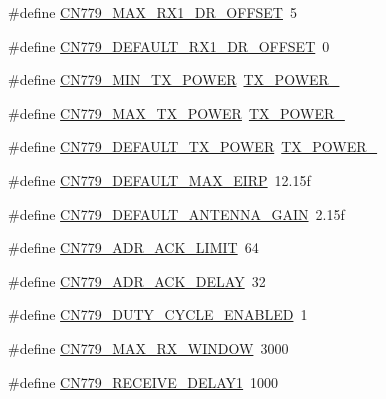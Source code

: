\begin{DoxyCompactItemize}
\item 
\#define \hyperlink{group__REGIONCN779_ga92a7cb914b3c213f1506f8dd927e6077}{C\+N779\+\_\+\+M\+A\+X\+\_\+\+R\+X1\+\_\+\+D\+R\+\_\+\+O\+F\+F\+S\+ET}~5
\item 
\#define \hyperlink{group__REGIONCN779_ga8e88b35f91ebd807975b5712ccbfef2a}{C\+N779\+\_\+\+D\+E\+F\+A\+U\+L\+T\+\_\+\+R\+X1\+\_\+\+D\+R\+\_\+\+O\+F\+F\+S\+ET}~0
\item 
\#define \hyperlink{group__REGIONCN779_gab0e266968cb85199e9002eb1d3c5a719}{C\+N779\+\_\+\+M\+I\+N\+\_\+\+T\+X\+\_\+\+P\+O\+W\+ER}~\hyperlink{group__REGION_ga0149d52581db80901b5bc1adf0aedd1d}{T\+X\+\_\+\+P\+O\+W\+E\+R\+\_}
\item 
\#define \hyperlink{group__REGIONCN779_ga8a70356561f3416db21a1e93b4ee4ae9}{C\+N779\+\_\+\+M\+A\+X\+\_\+\+T\+X\+\_\+\+P\+O\+W\+ER}~\hyperlink{group__REGION_gab33618449f2a573142c463ab071ef8ed}{T\+X\+\_\+\+P\+O\+W\+E\+R\+\_}
\item 
\#define \hyperlink{group__REGIONCN779_ga0a41ad46e00759176adb3ef4a8e937cb}{C\+N779\+\_\+\+D\+E\+F\+A\+U\+L\+T\+\_\+\+T\+X\+\_\+\+P\+O\+W\+ER}~\hyperlink{group__REGION_gab33618449f2a573142c463ab071ef8ed}{T\+X\+\_\+\+P\+O\+W\+E\+R\+\_}
\item 
\#define \hyperlink{group__REGIONCN779_ga77bd9b50f37cb6182e330e7203aab158}{C\+N779\+\_\+\+D\+E\+F\+A\+U\+L\+T\+\_\+\+M\+A\+X\+\_\+\+E\+I\+RP}~12.\+15f
\item 
\#define \hyperlink{group__REGIONCN779_ga055a39b4bc3aae2e812aab0a96561fee}{C\+N779\+\_\+\+D\+E\+F\+A\+U\+L\+T\+\_\+\+A\+N\+T\+E\+N\+N\+A\+\_\+\+G\+A\+IN}~2.\+15f
\item 
\#define \hyperlink{group__REGIONCN779_ga8c19c4c4ef1a00d6865607b7d61f0325}{C\+N779\+\_\+\+A\+D\+R\+\_\+\+A\+C\+K\+\_\+\+L\+I\+M\+IT}~64
\item 
\#define \hyperlink{group__REGIONCN779_ga56814f06a0fa6b826baad368920004a4}{C\+N779\+\_\+\+A\+D\+R\+\_\+\+A\+C\+K\+\_\+\+D\+E\+L\+AY}~32
\item 
\#define \hyperlink{group__REGIONCN779_ga87494ed194c1c38e301dbb4990f7f005}{C\+N779\+\_\+\+D\+U\+T\+Y\+\_\+\+C\+Y\+C\+L\+E\+\_\+\+E\+N\+A\+B\+L\+ED}~1
\item 
\#define \hyperlink{group__REGIONCN779_ga3d2b8590a2e727046db467d647c96518}{C\+N779\+\_\+\+M\+A\+X\+\_\+\+R\+X\+\_\+\+W\+I\+N\+D\+OW}~3000
\item 
\#define \hyperlink{group__REGIONCN779_gadd96388a9097e2d47d77a459b13c1309}{C\+N779\+\_\+\+R\+E\+C\+E\+I\+V\+E\+\_\+\+D\+E\+L\+A\+Y1}~1000
\item 

\end{DoxyCompactItemize}
